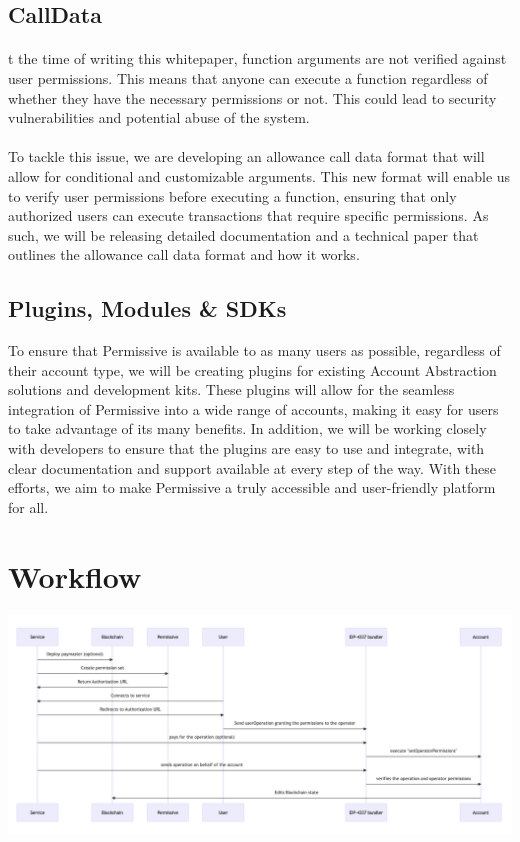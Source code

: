 \documentclass{article}
\begin{document}
\subsection{CallData}
\paragraph{}
t the time of writing this whitepaper, function arguments are not verified against user permissions. This means that anyone can execute a function regardless of whether they have the necessary permissions or not. This could lead to security vulnerabilities and potential abuse of the system.
\paragraph{}
To tackle this issue, we are developing an allowance call data format that will allow for conditional and customizable arguments. This new format will enable us to verify user permissions before executing a function, ensuring that only authorized users can execute transactions that require specific permissions. As such, we will be releasing detailed documentation and a technical paper that outlines the allowance call data format and how it works.
\subsection{Plugins, Modules \& SDKs}
To ensure that Permissive is available to as many users as possible, regardless of their account type, we will be creating plugins for existing Account Abstraction solutions and development kits. These plugins will allow for the seamless integration of Permissive into a wide range of accounts, making it easy for users to take advantage of its many benefits. In addition, we will be working closely with developers to ensure that the plugins are easy to use and integrate, with clear documentation and support available at every step of the way. With these efforts, we aim to make Permissive a truly accessible and user-friendly platform for all.
\section{Workflow}
\begin{center}
    \includegraphics[scale=0.2]{schema.png}
\end{center}
\end{document}
